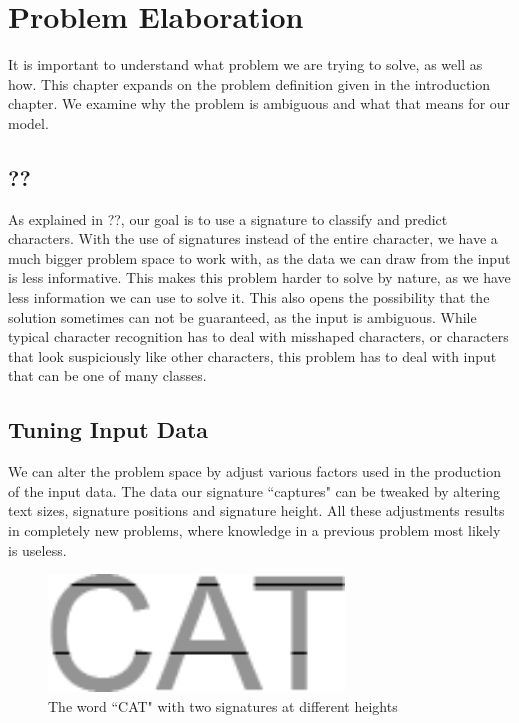
\chapter{Problem Elaboration}
It is important to understand what problem we are trying to solve, as well as how. This chapter expands on the problem definition given in the introduction chapter. We examine why the problem is ambiguous and what that means for our model. 

\section{??}
As explained in ??, our goal is to use a signature to classify and predict characters. With the use of signatures instead of the entire character, we have a much bigger problem space to work with, as the data we can draw from the input is less informative. This makes this problem harder to solve by nature, as we have less information we can use to solve it. This also opens the possibility that the solution sometimes can not be guaranteed, as the input is ambiguous. While typical character recognition has to deal with misshaped characters, or characters that look suspiciously like other characters, this problem has to deal with input that can be one of many classes.

\section{Tuning Input Data}
\label{sec:tuning_input_data}
We can alter the problem space by adjust various factors used in the production of the input data. The data our signature ``captures" can be tweaked by altering text sizes, signature positions and signature height. All these adjustments results in completely new problems, where knowledge in a previous problem most likely is useless.

\begin{figure}[ht]
    \centering
    \includegraphics[width=0.7\textwidth]{fig/chapter2/signature_multiple.png}
    \caption{The word ``CAT" with two signatures at different heights}
    \label{fig:thesis-signature-comparison}
\end{figure}

